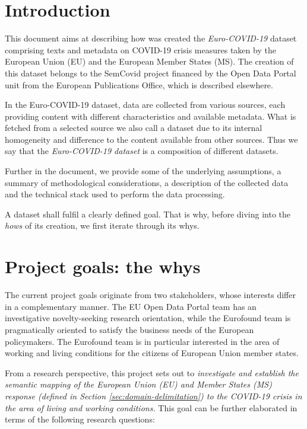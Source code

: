 
\section{Introduction}

This document aims at describing how was created the \textit{Euro-COVID-19} dataset comprising texts and metadata on COVID-19 crisis measures taken by the European Union (EU) and the European Member States (MS). The creation of this dataset belongs to the SemCovid project financed by the Open Data Portal unit from the European Publications Office, which is described elsewhere. 

In the Euro-COVID-19 dataset, data are collected from various sources, each providing content with different characteristics and available metadata. What is fetched from a selected source we also call a dataset due to its internal homogeneity and difference to the content available from other sources. Thus we say that the \textit{Euro-COVID-19 dataset} is a composition of different datasets.

Further in the document, we provide some of the underlying assumptions, a summary of methodological considerations, a description of the collected data and the technical stack used to perform the data processing. 

A dataset shall fulfil a clearly defined goal. That is why, before diving into the \textit{hows} of its creation, we first iterate through its whys.

\section{Project goals: the whys}
\label{sec:goals}

The current project goals originate from two stakeholders, whose interests differ in a complementary manner. The EU Open Data Portal team has an investigative novelty-seeking research orientation, while the Eurofound team is pragmatically oriented to satisfy the business needs of the European policymakers. The Eurofound team is in particular interested in the area of working and living conditions for the citizens of European Union member states.

From a research perspective, this project sets out to \textit{investigate and establish the semantic mapping of the European Union (EU) and Member States (MS) response (defined in Section \ref{sec:domain-delimitation}) to the COVID-19 crisis in the area of living and working conditions.} This goal can be further elaborated in terms of the following research questions:

